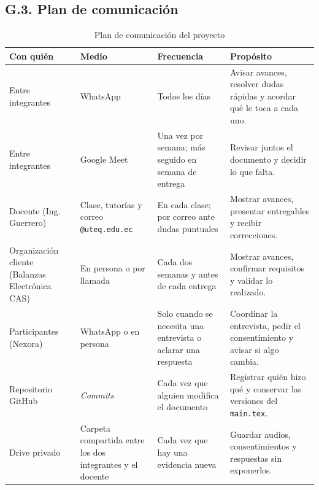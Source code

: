 \documentclass[11pt,a4paper]{article}
\renewcommand{\arraystretch}{1.22}
\begin{document}
\subsection*{G.3. Plan de comunicaci\'on}
\begin{table}[H]
\centering
\caption{Plan de comunicaci\'on del proyecto}
\label{tab:comunicacion}
\footnotesize
\renewcommand{\arraystretch}{1.12}
\begin{tabularx}{\textwidth}{|L{3.1cm}|L{2.9cm}|L{3.2cm}|Y|}
\hline
{}
\textbf{Con qui\'en} & \textbf{Medio} & \textbf{Frecuencia} & \textbf{Prop\'osito} \\
\hline
Entre integrantes & WhatsApp & Todos los d\'ias & Avisar avances, resolver dudas r\'apidas y acordar qu\'e le toca a cada uno. \\
\hline
Entre integrantes & Google Meet & Una vez por semana; m\'as seguido en semana de entrega & Revisar juntos el documento y decidir lo que falta. \\
\hline
Docente (Ing. Guerrero) & Clase, tutor\'ias y correo \texttt{@uteq.edu.ec} & En cada clase; por correo ante dudas puntuales & Mostrar avances, presentar entregables y recibir correcciones. \\
\hline
Organizaci\'on cliente (Balanzas Electr\'onica CAS) & En persona o por llamada & Cada dos semanas y antes de cada entrega & Mostrar avances, confirmar requisitos y validar lo realizado. \\
\hline
Participantes (Nexora) & WhatsApp o en persona & Solo cuando se necesita una entrevista o aclarar una respuesta & Coordinar la entrevista, pedir el consentimiento y avisar si algo cambia. \\
\hline
Repositorio GitHub & \emph{Commits} & Cada vez que alguien modifica el documento & Registrar qui\'en hizo qu\'e y conservar las versiones del \texttt{main.tex}. \\
\hline
Drive privado & Carpeta compartida entre los dos integrantes y el docente & Cada vez que hay una evidencia nueva & Guardar audios, consentimientos y respuestas sin exponerlos. \\
\hline
\end{tabularx}
\end{table}
\end{document}
